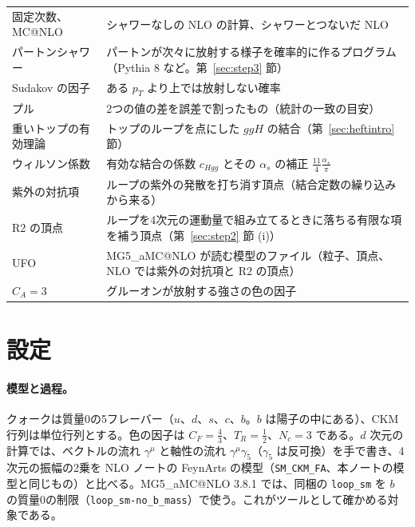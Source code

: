 \documentclass[a4paper,10pt]{ltjsarticle}
\makeatletter
\newcommand{\MGaMC}{MG5\_aMC@NLO}
\makeatother
\begin{document}
\begin{table}[htbp]
\begin{tabularx}{\linewidth}{>{\raggedright\arraybackslash}p{3.6cm}X}
固定次数、MC@NLO & シャワーなしの NLO の計算、シャワーとつないだ NLO \\
パートンシャワー & パートンが次々に放射する様子を確率的に作るプログラム（Pythia 8 など。第~\ref{sec:step3} 節） \\
Sudakov の因子 & ある $p_T$ より上では放射しない確率 \\
プル & 2つの値の差を誤差で割ったもの（統計の一致の目安） \\
重いトップの有効理論 & トップのループを点にした $ggH$ の結合（第~\ref{sec:heftintro} 節） \\
ウィルソン係数 & 有効な結合の係数 $c_{Hgg}$ とその $\alpha_s$ の補正 $\frac{11}4\frac{\alpha_s}\pi$ \\
紫外の対抗項 & ループの紫外の発散を打ち消す頂点（結合定数の繰り込みから来る） \\
R2 の頂点 & ループを4次元の運動量で組み立てるときに落ちる有限な項を補う頂点（第~\ref{sec:step2} 節 (i)） \\
UFO & \MGaMC{} が読む模型のファイル（粒子、頂点、NLO では紫外の対抗項と R2 の頂点） \\
$C_A=3$ & グルーオンが放射する強さの色の因子 \\
\bottomrule
\end{tabularx}
\end{table}

\section{設定}\label{sec:setup}

\paragraph{模型と過程。}クォークは質量0の5フレーバー（$u$、$d$、$s$、$c$、$b$。$b$ は陽子の中にある）、CKM 行列は単位行列とする。色の因子は $C_F=\frac43$、$T_R=\frac12$、$N_c=3$ である。$d$ 次元の計算では、ベクトルの流れ $\gamma^\mu$ と軸性の流れ $\gamma^\mu\gamma_5$（$\gamma_5$ は反可換）を手で書き、4次元の振幅の2乗を NLO ノートの FeynArts の模型（\texttt{SM\_CKM\_FA}、本ノートの模型と同じもの）と比べる。\MGaMC{} 3.8.1 では、同梱の \texttt{loop\_sm} を $b$ の質量0の制限（\texttt{loop\_sm-no\_b\_mass}）で使う。これがツールとして確かめる対象である。
\end{document}
